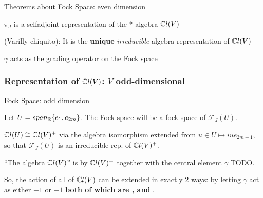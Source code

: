 \begin{frame}{Theorems about Fock Space: even dimension} %

    \begin{theorem}$\pi_J$ is a selfadjoint representation of the *-algebra $\mathbb C l(V)$\end{theorem}%
    
    \begin{theorem}(Varilly chiquito): It is the \textbf{unique} \emph{irreducible} algebra representation of $\mathbb C l(V)$\end{theorem}%
    
    \begin{proposition} $\gamma$ acts as the grading operator on the Fock space\end{proposition}%

\end{frame}

\subsubsection{Representation of $\mathbb C l(V)$: $V$ odd-dimensional}

\begin{frame}{Fock Space: odd dimension} %

    Let $U = span_\mathbb R\{e_1, e_{2m}\}$. The Fock space will be a fock space of $\mathcal F_J(U)$.
    
    $\mathbb C l(U) \cong \mathbb C l(V)^+$ via the algebra isomorphism extended from $u \in U \mapsto iue_{2m+1}$, so that $\mathcal F_J(U)$ is an irreducible rep. of $\mathbb C l(V)^+$.
    
    ``The algebra $\mathbb C l(V)$'' is  by $\mathbb C l(V)^+$ together with the central element $\gamma$ TODO.
    
    So, the action of all of $\mathbb C l(V)$ can be extended in exactly $2$ ways: by letting $\gamma$ act as either $+1$ or $-1$ \textbf{both of which are , and }.
    

\end{frame}

